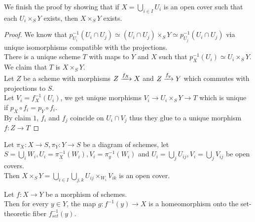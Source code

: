 \documentclass[../main.tex]{subfiles}
\begin{document}
We finish the proof by showing that if $X= \bigcup_{i \in I} U_i$ is an open cover such that each $U_i \times_S Y$ exists, then $X\times_S Y$ exists.
\begin{proof}
We know that $p_{U_i} ^{-1}( U_i\cap U_j) \simeq ( U_i \cap U_j) \times_S Y \simeq p_{U_j}^{-1}( U_i\cap U_j) $ via unique isomorphisms compatible with the projections.\\
There is a unique scheme $T$ with maps to $Y$ and $X$ such that $p_X^{-1}( U_i) \simeq U_i \times_S Y$.\\
We claim that $T$ is $X\times_S Y$.\\
Let $Z$ be a scheme with morphisms $Z\xrightarrow{ f_X}  X$ and $Z\xrightarrow{f_y} Y$ which commutes with projections to $S$.\\
Let $V_i= f_X^{-1}( U_i) $, we get unique morphisms $V_i \to U_i\times_S Y \to T$ which is unique if $p_X \circ f_i = p_Y \circ f_i$.\\
By claim $1$, $f_i$ and $f_j$ coincide on $U_{i} \cap V_j$ thus they glue to a unique morphism $f:Z\to T$ 
\end{proof}
\begin{crly}
Let $\pi_X:X\to S,\pi_Y:Y\to S$ be a diagram of schemes, let $S= \bigcup_i W_i, U_i = \pi_X^{-1}( W_i) , V_i = \pi_y^{-1}( W_i) $ and $U_i = \bigcup_j U_{ij} , V_i = \bigcup_{j} V_{ij} $ be open covers.\\
Then $X\times_S Y = \bigcup_{i \in I} \bigcup_{j,k} U_{ij} \times_{W_i} V_{ik} $ is an open cover.
\end{crly}
\begin{propo}
Let $f:X\to Y$ be a morphism of schemes.\\
Then for every $y \in Y$, the map $g:f^{-1}( y) \to X$ is a homeomorphism onto the set-theoretic fiber $f_{set}^{-1}( y) $.
\end{propo}
\end{document}
